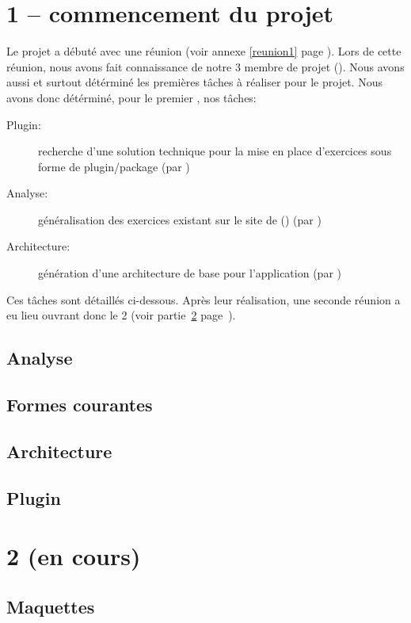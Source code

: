 \documentclass[french]{report}
\begin{document}
\section{1\ier{} \sprint{} -- commencement du projet}
\label{sprint1}
Le projet a débuté avec une réunion (voir annexe \ref{reunion1} page \pageref{reunion1}). Lors de cette réunion, nous avons fait connaissance de notre 3\ieme{} membre de projet (\etudiantSL{}). Nous avons aussi et surtout détérminé les premières t\^{a}ches à réaliser pour le projet.
Nous avons donc détérminé, pour le premier \sprint{}, nos t\^aches:
\begin{description}
	\item[Plugin:] recherche d'une solution technique pour la mise en place d'exercices sous forme de plugin/package (par \etudiantSL{})
	\item[Analyse:] \og{}généralisation\fg{} des exercices existant sur le site de \pepit{} (\pepitSite{}) (par \etudiantRD{})
	\item[Architecture:] génération d'une architecture de base pour l'application (par \etudiantJP{})
\end{description}
Ces tâches sont détaillés ci-dessous. Après leur réalisation, une seconde réunion a eu lieu ouvrant donc le 2\ieme{} \sprint{} (voir partie~\ref{sprint2} page~\pageref{sprint2}).
\subsection{Analyse}
\label{partie_analyse}

\subsection{Formes courantes}
\label{partie_formes_courantes}

\subsection{Architecture}
\label{partie_architecture}

\subsection{Plugin}
\label{partie_plugin}

\section{2\ieme{} \sprint{} (en cours)}
\label{sprint2}
\subsection{Maquettes}
\label{partie_maquettes}

\end{document}
